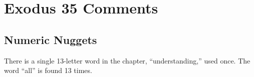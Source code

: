 \section{Exodus 35 Comments}

\subsection{Numeric Nuggets}
There is a single 13-letter word in the chapter, ``understanding,'' used once. The word ``all'' is found 13 times.

